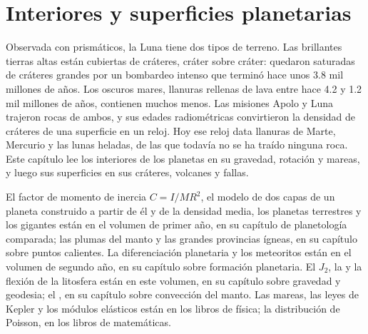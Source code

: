 \chapter{Interiores y superficies planetarias}\label{ch:b3:planetary-interiors-surfaces}

Observada con prismáticos, la Luna tiene dos tipos de terreno. Las brillantes
tierras altas están cubiertas de cráteres, cráter sobre cráter: quedaron saturadas
de cráteres grandes por un bombardeo intenso que terminó hace unos 3.8 mil millones de
años. Los oscuros mares, llanuras rellenas de lava entre hace 4.2 y 1.2
mil millones de años, contienen muchos menos. Las misiones Apolo y Luna
trajeron rocas de ambos, y sus edades radiométricas convirtieron
la densidad de cráteres de una superficie en un reloj. Hoy ese reloj data
llanuras de Marte, Mercurio y las lunas heladas, de las que todavía no se ha
traído ninguna roca. Este capítulo lee los interiores de los planetas en su
gravedad, rotación y mareas, y luego sus superficies en sus cráteres,
volcanes y fallas.

\begin{recall}
El factor de momento de inercia $C = I/MR^2$, el modelo de dos capas de un planeta
construido a partir de él y de la densidad media, los planetas terrestres y los
gigantes están en el volumen de primer año, en su capítulo de planetología
comparada; las plumas del manto y las grandes provincias ígneas, en su capítulo sobre
puntos calientes. La diferenciación planetaria y los meteoritos están en el volumen de
segundo año, en su capítulo sobre formación planetaria. El 
$J_2$, la  y la flexión de la litosfera están en este
volumen, en su capítulo sobre gravedad y geodesia; el , en su
capítulo sobre convección del manto. Las mareas, las leyes de Kepler y los módulos
elásticos están en los libros de física; la distribución de Poisson, en los
libros de matemáticas.
\end{recall}

